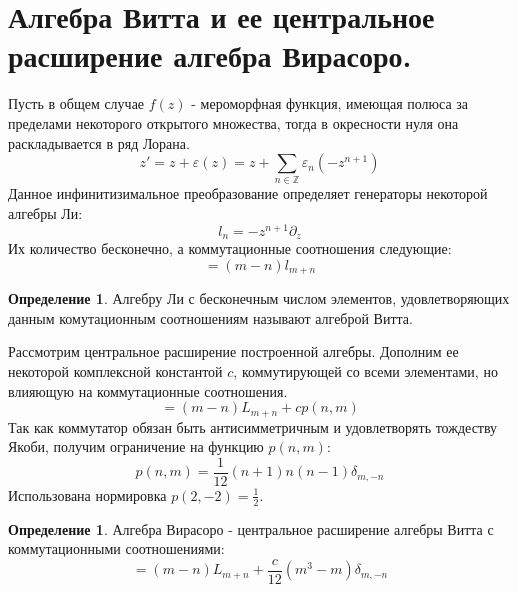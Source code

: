 \documentclass[12pt]{article}
\theoremstyle{definition}
\newtheorem{defin}[theorem]{Определение}
\begin{document}
  \section{Алгебра Витта и ее центральное расширение алгебра Вирасоро.}
 Пусть в общем случае $f(z)$ - мероморфная функция, имеющая полюса за пределами некоторого открытого множества, тогда в окресности нуля она раскладывается в ряд Лорана.
 \begin{equation}
z'=z+\varepsilon(z)=z+\sum_{n\in\mathbb{Z}}\varepsilon_n(-z^{n+1}) 
\end{equation}
Данное инфинитизимальное преобразование определяет генераторы некоторой алгебры Ли:
 \begin{equation}
l_n = -z^{n+1}\partial_z
\end{equation}
Их количество бесконечно, а коммутационные соотношения следующие:
\begin{equation}
[l_m,l_n] = (m-n)l_{m+n}
\end{equation}
 \begin{defin}
Алгебру Ли с бесконечным числом элементов, удовлетворяющих данным комутационным соотношениям называют алгеброй Витта.
\end{defin}
Рассмотрим центральное расширение построенной алгебры. Дополним ее некоторой комплексной константой $c$, коммутирующей со всеми элементами, но влияющую на коммутационные соотношения.
\begin{equation}
[L_m,L_n] = (m-n)L_{m+n}+cp(n,m)
\end{equation}
Так как коммутатор обязан быть антисимметричным и удовлетворять тождеству Якоби, получим ограничение на функцию $p(n,m)$:
\begin{equation}
p(n,m)=\frac{1}{12}(n+1)n(n-1)\delta_{m,-n}
\end{equation}
Использована нормировка $p(2,-2)=\frac{1}{2}$.
 \begin{defin}
Алгебра Вирасоро - центральное расширение алгебры Витта с коммутационными соотношениями:
\begin{equation}
[L_m,L_n] = (m-n)L_{m+n}+\frac{c}{12}(m^3-m)\delta_{m,-n}
\end{equation}
\end{defin}
\end{document}

